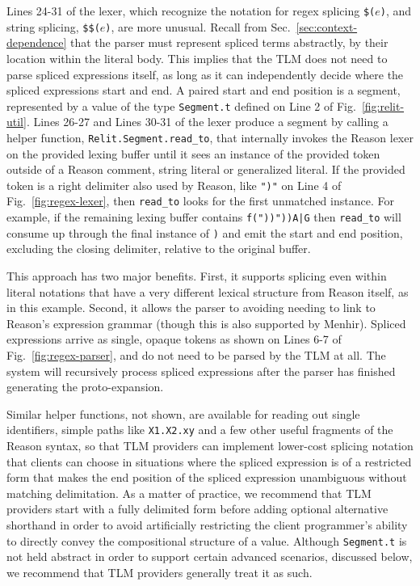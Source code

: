 \documentclass[acmsmall]{acmart}
\newcommand{\li}[1]{\lstinline[basicstyle=\ttfamily\fontsize{9pt}{1em}\selectfont]{#1}}
\begin{document}
Lines 24-31 of the lexer, which recognize the notation for regex splicing \li{$(}$e$\li{)}, and string splicing, \li{$$(}$e$\li{)}, are more unusual. Recall from Sec.~\ref{sec:context-dependence} that the parser must represent spliced terms abstractly, by their location within the literal body. This implies that the TLM does not need to parse spliced expressions itself, as long as it can independently decide where the spliced expressions start and end. A paired start and end position is a segment,  represented by a value of the type \li{Segment.t} defined on Line 2 of Fig.~\ref{fig:relit-util}. Lines 26-27 and Lines 30-31 of the lexer produce a segment by calling a helper function, \li{Relit.Segment.read_to}, that internally invokes the Reason lexer on the provided lexing buffer until it sees an instance of the provided token outside of a Reason comment, string literal or generalized literal. If the provided token is a right delimiter also used by Reason, like \li{")"} on Line 4 of Fig.~\ref{fig:regex-lexer}, then \li{read_to} looks for the first unmatched instance. For example, if the remaining lexing buffer contains {\small \texttt{f("))"))A|G}} then \li{read_to} will consume up through the final instance of \li{)} and emit the start and end position, excluding the closing delimiter, relative to the original buffer.

This approach has two major benefits. First, it supports splicing even within literal notations that have a very different lexical structure from Reason itself, as in this example. Second, it allows the parser to avoiding needing to link to Reason's expression grammar (though this is also supported by Menhir). Spliced expressions arrive as single, opaque tokens as shown on Lines 6-7 of Fig.~\ref{fig:regex-parser}, and do not need to be parsed by the TLM at all. The system will recursively process spliced expressions after the parser has finished generating the proto-expansion.

Similar helper functions, not shown, are available for reading out single identifiers, simple paths like \li{X1.X2.xy} and a few other useful fragments of the Reason syntax, so that TLM providers can implement lower-cost splicing notation that clients can choose in situations where the spliced expression is of a restricted form that makes the end position of the spliced expression unambiguous without matching delimitation. As a matter of practice, we recommend that TLM providers start with a fully delimited form before adding optional alternative shorthand in order to avoid artificially restricting the client programmer's ability to directly convey the compositional structure of a value. 
Although \li{Segment.t} is not held abstract in order to support certain advanced scenarios, discussed below, we recommend that TLM providers generally treat it as such.
\end{document}

